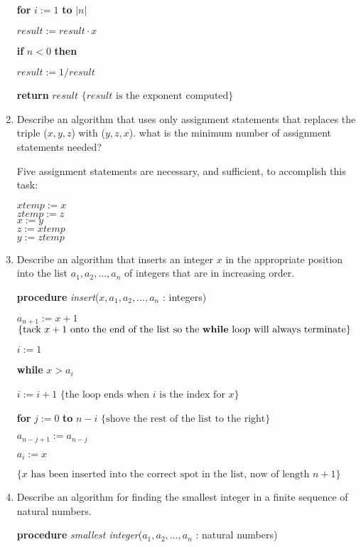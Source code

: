 \documentclass[11pt]{article}
\begin{document}
\begin{enumerate}[label=\textbf{\arabic*.}]
	\textbf{for} $i := 1$ \textbf{to} $|n|$
	
	\qquad $result := result \cdot x$
	
	\textbf{if} $n < 0$ \textbf{then}
	
	\qquad $result := 1 / result$
	
	\textbf{return} $result$ $\{ result \text{ is the exponent computed} \}$
	
	\item Describe an algorithm that uses only assignment statements that replaces the triple ($x, y, z$) with ($y, z, x$). what is the minimum number of assignment statements needed?
	
	Five assignment statements are necessary, and sufficient, to accomplish this task:
	
	$xtemp := x$ \\
	$ztemp := z$ \\
	$x := y$ \\
	$z := xtemp$ \\
	$y := ztemp$
	
	\item Describe an algorithm that inserts an integer $x$ in the appropriate position into the list $a_1, a_2, \ldots, a_n$ of integers that are in increasing order.
	
	\textbf{procedure} \emph{insert}($x, a_1, a_2, \ldots, a_n$ : integers)
	
	$a_{n + 1} := x + 1$ $\{ \text{tack } x + 1 \text{ onto the end of the list so the \textbf{while} loop will always terminate} \}$
	
	$i := 1$
	
	\textbf{while} $x > a_i$
	
	\qquad $i := i + 1$ $\{ \text{the loop ends when } i \text{ is the index for } x \}$
	
	\textbf{for} $j := 0$ \textbf{to} $n - i$ $\{ \text{shove the rest of the list to the right} \}$
	
	\qquad $a_{n - j + 1} := a_{n - j}$
	
	$a_i := x$
	
	$\{ x \text{ has been inserted into the correct spot in the list, now of length } n + 1 \}$
	
	\item Describe an algorithm for finding the smallest integer in a finite sequence of natural numbers.
	
	\textbf{procedure} \emph{smallest integer}($a_1, a_2, \ldots, a_n$ : natural numbers)
	

\end{enumerate}
\end{document}

